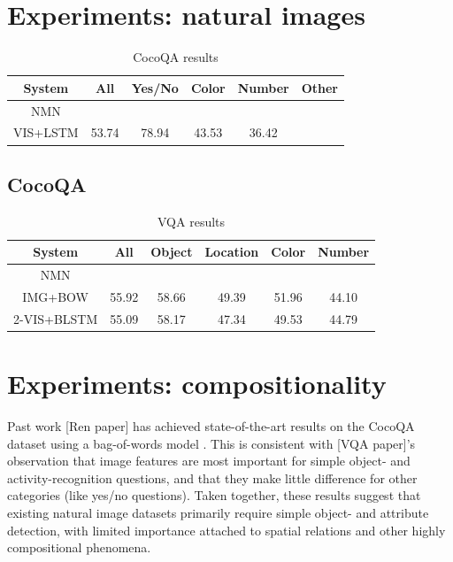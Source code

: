 \documentclass[10pt,twocolumn,letterpaper]{article}
\begin{document}
\section{Experiments: natural images}

\begin{table}[h]
  \footnotesize
  \center
  \begin{tabular}{cccccc}
    \toprule
    System & All & Yes/No & Color & Number & Other \\
    \midrule
    NMN \\
    VIS+LSTM & 53.74 & 78.94 & 43.53 & 36.42 & \\
    \bottomrule
  \end{tabular}
  \caption{CocoQA results}
\end{table}

\subsection{CocoQA}

\begin{table}[h]
  \footnotesize
  \center
  \begin{tabular}{cccccc}
    \toprule
    System & All & Object & Location & Color & Number \\
    \midrule
    NMN \\
    IMG+BOW & 55.92 & 58.66 & 49.39 & 51.96 & 44.10 \\
    2-VIS+BLSTM & 55.09 & 58.17 & 47.34 & 49.53 & 44.79 \\
    \bottomrule
  \end{tabular}
  \caption{VQA results}
\end{table}


\section{Experiments: compositionality}

Past work [Ren paper] has achieved state-of-the-art results on the CocoQA
dataset using a bag-of-words model . This is consistent with [VQA paper]'s
observation that image features are most important for simple object- and
activity-recognition questions, and that they make little difference for other
categories (like yes/no questions). Taken together, these results suggest that
existing natural image datasets primarily require simple object- and attribute
detection, with limited importance attached to spatial relations and other
highly compositional phenomena.
\end{document}
